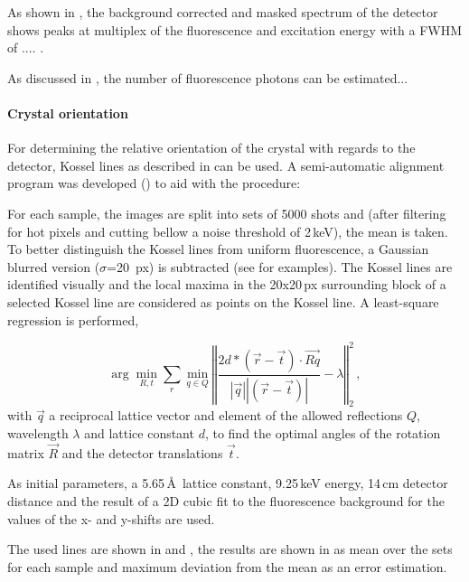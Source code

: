 As shown in , the background corrected and masked spectrum of the detector shows peaks at multiplex of the fluorescence and excitation energy with a FWHM of .... . 


As discussed in , the number of fluorescence photons can be estimated...




\paragraph{Crystal orientation}
For determining the relative orientation of the crystal with regards to the detector, Kossel lines as described in  can be used.  A semi-automatic alignment program was developed () to aid with the procedure: 

For each sample, the images are split into sets of 5000 shots and (after filtering for hot pixels and cutting bellow a noise threshold of 2\,keV), the mean is taken. To better distinguish the Kossel lines from uniform fluorescence, a Gaussian blurred version ($\sigma$=20\, px) is subtracted (see  for examples). The Kossel lines are identified visually and the local maxima in the 20x20\,px surrounding block of a selected Kossel line are considered as points on the Kossel line. A least-square regression is performed,

\begin{equation}
	\arg\!\min_{R,t} \sum_{r} \min_{q\in Q} \left\Vert \frac{2 d * \left( \vec{r} - \vec{t} \right) \cdot \vec{Rq}}{\left|\vec{q}\right| \left| \left(\vec{r}-\vec{t}\right)\right|} -\lambda \right\Vert_2^2 \,,
\end{equation}
with
$\vec{q}$ a reciprocal lattice vector and element of the allowed reflections $Q$, wavelength $\lambda$ and lattice constant $d$, to find
 the optimal angles of the rotation matrix $\vec{R}$ and the detector translations $\vec{t}$.

As initial parameters, a 5.65\,\AA\, lattice constant, 9.25\,keV energy, 14\,cm detector distance and the result of a 2D cubic fit to the fluorescence background for the values of the x- and y-shifts are used. 

The used lines are shown in  and , the results are shown in  as mean over the sets for each sample and maximum deviation from the mean as an error estimation.

